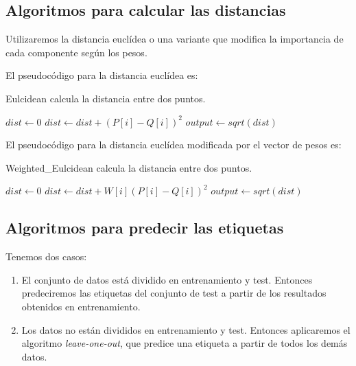 \documentclass[11pt,a4paper]{article}
\begin{document}
\subsection{Algoritmos para calcular las distancias}

Utilizaremos la distancia euclídea o una variante que modifica la importancia de cada componente según los pesos.

El pseudocódigo para la distancia euclídea es: \\
\begin{algorithm}[H]
	\caption{{\sc Eulcidean} calcula la distancia entre dos puntos.}
	
	$dist \gets 0$ \;
	 {
		$dist \gets dist + (P[i] - Q[i])^{2}$ \;
	}
	$output \gets sqrt(dist)$ \;
	 \;
\end{algorithm}

El pseudocódigo para la distancia euclídea modificada por el vector de pesos es: \\
\begin{algorithm}[H]
	\caption{{\sc Weighted\_Eulcidean} calcula la distancia entre dos puntos.}
	
	$dist \gets 0$ \;
	 {
		$dist \gets dist + W[i] (P[i] - Q[i])^{2}$ \;
	}
	$output \gets sqrt(dist)$ \;
	 \;
\end{algorithm}

\subsection{Algoritmos para predecir las etiquetas}

Tenemos dos casos:
\begin{enumerate}
\item El conjunto de datos está dividido en entrenamiento y test. Entonces predeciremos las etiquetas del conjunto de test a partir de los resultados obtenidos en entrenamiento.
\item Los datos no están divididos en entrenamiento y test. Entonces aplicaremos el algoritmo \emph{leave-one-out}, que predice una etiqueta a partir de todos los demás datos.
\end{enumerate}
\end{document}
